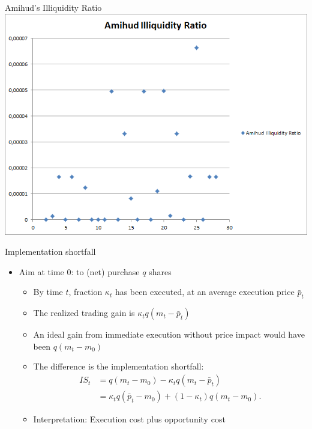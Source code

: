 \begin{frame}{Amihud's Illiquidity Ratio}
\center
\includegraphics[scale=0.39]{pics/L2_Amihud}
\end{frame}


\begin{frame}{Implementation shortfall}
	\begin{itemize}
		\item Aim at time 0: to (net) purchase $q$ shares
		\begin{itemize}
			\item By time $t$, fraction $\kappa_t$ has been executed, at an average execution price $\bar{p}_t$
			\item The realized trading gain is $\kappa_t q(m_t-\bar{p}_t)$
			\item An ideal gain from immediate execution without price impact would have been $q(m_t - m_0)$
			\item The difference is the \alert{implementation shortfall}:
			\begin{align*}
			IS_t 
			& = q(m_t-m_0) - \kappa_t q (m_t - \bar{p}_t) \\
			& = \kappa_t q(\bar{p}_t - m_0) + (1-\kappa_t) q (m_t - m_0).
			\end{align*}
			\item Interpretation: Execution cost plus opportunity cost
		\end{itemize}
	\end{itemize}
\end{frame}


